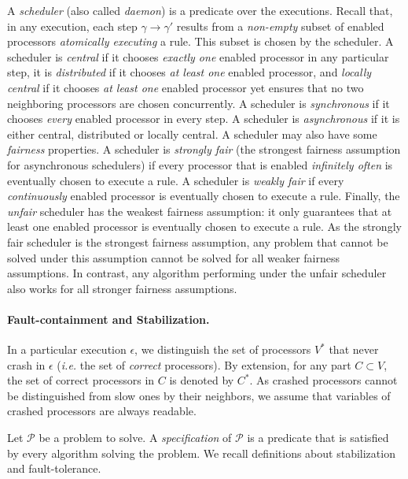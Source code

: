 \documentclass[11pt,english,letterpaper]{article}
\begin{document}
A \emph{scheduler} (also called \emph{daemon}) is a predicate over the executions. Recall that, in any execution, each step $\gamma \longrightarrow \gamma'$ results from a \emph{non-empty} subset of enabled processors \emph{atomically executing} a rule. This subset is chosen by the scheduler. A scheduler is \emph{central} if it chooses \emph{exactly one} enabled processor in any particular step, it is \emph{distributed} if it chooses \emph{at least one} enabled processor, and \emph{locally central} if it chooses \emph{at least one} enabled processor yet ensures that no two neighboring processors are chosen concurrently. A scheduler is \emph{synchronous} if it chooses \emph{every} enabled processor in every step. A scheduler is \emph{asynchronous} if it is either central, distributed or locally central. A scheduler may also have some \emph{fairness} properties. A scheduler is \emph{strongly fair} (the strongest fairness assumption for asynchronous schedulers) if every processor that is enabled \emph{infinitely often} is eventually chosen to execute a rule. A scheduler is \emph{weakly fair} if every \emph{continuously} enabled processor is eventually chosen to execute a rule. Finally, the \emph{unfair} scheduler has the weakest fairness assumption: it only guarantees that at least one enabled processor is eventually chosen to execute a rule. As the strongly fair scheduler is the strongest fairness assumption, any problem that cannot be solved under this assumption cannot be solved for all weaker fairness assumptions. In contrast, any algorithm performing under the unfair scheduler also works for all stronger fairness assumptions. 

\paragraph{Fault-containment and Stabilization.} In a particular execution $\epsilon$, we distinguish the set of processors $V^*$ that never crash in $\epsilon$ (\emph{i.e.} the set of \emph{correct} processors). By extension, for any part $C\subset V$, the set of correct processors in $C$ is denoted by $C^{*}$. As crashed processors cannot be distinguished from slow ones by their neighbors, we assume that variables of crashed processors are always readable. 

Let $\mathcal{P}$ be a problem to solve. A \emph{specification} of $\mathcal{P}$ is a predicate that is satisfied by every algorithm solving the problem. We recall definitions about stabilization and fault-tolerance.
\end{document}
